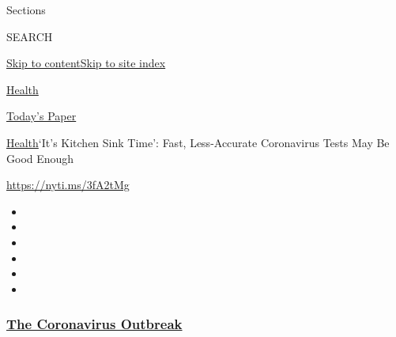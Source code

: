 Sections

SEARCH

\protect\hyperlink{site-content}{Skip to
content}\protect\hyperlink{site-index}{Skip to site index}

\href{https://www.nytimes3xbfgragh.onion/section/health}{Health}

\href{https://myaccount.nytimes3xbfgragh.onion/auth/login?response_type=cookie\&client_id=vi}{}

\href{https://www.nytimes3xbfgragh.onion/section/todayspaper}{Today's
Paper}

\href{/section/health}{Health}\textbar{}`It's Kitchen Sink Time': Fast,
Less-Accurate Coronavirus Tests May Be Good Enough

\url{https://nyti.ms/3fA2tMg}

\begin{itemize}
\item
\item
\item
\item
\item
\item
\end{itemize}

\hypertarget{the-coronavirus-outbreak}{%
\subsubsection{\texorpdfstring{\href{https://www.nytimes3xbfgragh.onion/news-event/coronavirus?name=styln-coronavirus-national\&region=TOP_BANNER\&variant=undefined\&block=storyline_menu_recirc\&action=click\&pgtype=Article\&impression_id=bdaebe10-e386-11ea-89f5-73e141fcc61b}{The
Coronavirus
Outbreak}}{The Coronavirus Outbreak}}\label{the-coronavirus-outbreak}}

